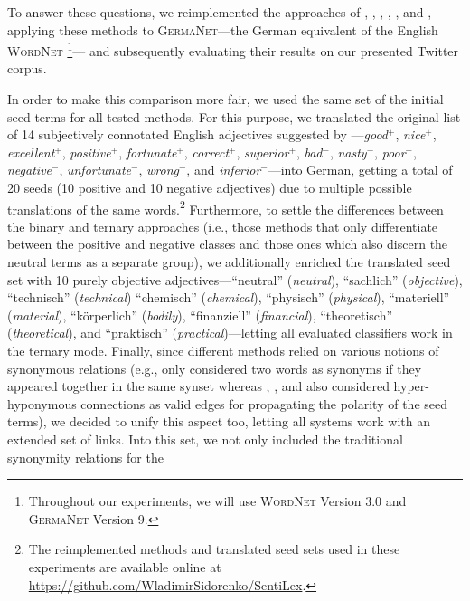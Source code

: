 To answer these questions, we reimplemented the approaches of
\citet{Hu:04}, \citet{Blair-Goldensohn:08}, \citet{Kim:04,Kim:06},
\citet{Esuli:06c}, \citet{Rao:09}, and \citet{Awadallah:10}, applying
these methods to \textsc{GermaNet}---the German equivalent of the
English \textsc{WordNet} \cite{Hamp:97}\footnote{Throughout our
  experiments, we will use \textsc{WordNet} Version 3.0 and
  \textsc{GermaNet} Version 9.}--- and subsequently evaluating their
results on our presented Twitter corpus.

In order to make this comparison more fair, we used the same set of
the initial seed terms for all tested methods.  For this purpose, we
translated the original list of 14 subjectively connotated English
adjectives suggested by \citet{Turney:03}---\emph{good}$^+$,
\emph{nice}$^+$, \emph{excellent}$^+$, \emph{positive}$^+$,
\emph{fortunate}$^+$, \emph{correct}$^+$, \emph{superior}$^+$,
\emph{bad}$^-$, \emph{nasty}$^-$, \emph{poor}$^-$,
\emph{negative}$^-$, \emph{unfortunate}$^-$, \emph{wrong}$^-$, and
\emph{inferior}$^-$---into German, getting a total of 20 seeds (10
positive and 10 negative adjectives) due to multiple possible
translations of the same words.\footnote{The reimplemented methods and
  translated seed sets used in these experiments are available online
  at \url{https://github.com/WladimirSidorenko/SentiLex}.}
Furthermore, to settle the differences between the binary and ternary
approaches (i.e., those methods that only differentiate between the
positive and negative classes and those ones which also discern the
neutral terms as a separate group), we additionally enriched the
translated seed set with 10 purely objective adjectives---``neutral''
(\emph{neutral}), ``sachlich'' (\emph{objective}), ``technisch''
(\emph{technical}) ``chemisch'' (\emph{chemical}), ``physisch''
(\emph{physical}), ``materiell'' (\emph{material}), ``k\"orperlich''
(\emph{bodily}), ``finanziell'' (\emph{financial}), ``theoretisch''
(\emph{theoretical}), and ``praktisch'' (\emph{practical})---letting
all evaluated classifiers work in the ternary mode.  Finally, since
different methods relied on various notions of synonymous relations
(e.g., \citet{Hu:04} only considered two words as synonyms if they
appeared together in the same synset whereas \citet{Esuli:06c},
\citet{Rao:09}, and \citet{Awadallah:10} also considered
hyper-hyponymous connections as valid edges for propagating the
polarity of the seed terms), we decided to unify this aspect too,
letting all systems work with an extended set of links.  Into this
set, we not only included the traditional synonymity relations for the
